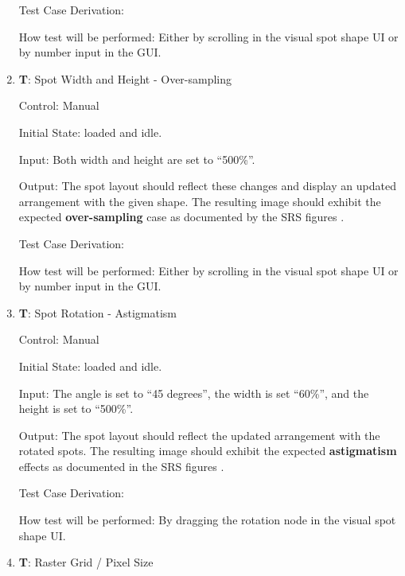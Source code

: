 \documentclass[12pt, titlepage]{article}
\newcounter{testnum} %
\begin{document}
\begin{enumerate}
    Test Case Derivation: 
              
    How test will be performed: Either by scrolling in the visual spot shape UI or by number input in the GUI.
					
    \item{\textbf{T\thetestnum \label{T_spotSize500}}: Spot Width and Height - Over-sampling\\}

    Control: Manual
              
    Initial State: \progname{} loaded and idle.
              
    Input: Both width and height are set to ``500\%''.
              
    Output: The spot layout should reflect these changes and display an updated arrangement with the given shape.
    The resulting image should exhibit the expected \textbf{over-sampling} case as documented by the SRS figures \citep{SRS}.

    Test Case Derivation: 
              
    How test will be performed: Either by scrolling in the visual spot shape UI or by number input in the GUI.
					
  \item{\textbf{T\thetestnum \label{T_spotRotation}}: Spot Rotation - Astigmatism\\}

    Control: Manual
                
    Initial State: \progname{} loaded and idle.
              
    Input: The angle is set to ``45 degrees'', the width is set ``60\%'', and the height is set to ``500\%''.
              
    Output: The spot layout should reflect the updated arrangement with the rotated spots.
    The resulting image should exhibit the expected \textbf{astigmatism} effects as documented in the SRS figures \citep{SRS}.

    Test Case Derivation: 

    How test will be performed: By dragging the rotation node in the visual spot shape UI.
					
    \item{\textbf{T\thetestnum \label{T_rasterGrid}}: Raster Grid / Pixel Size\\}


\end{enumerate}
\end{document}
